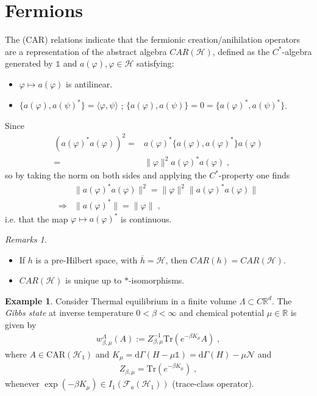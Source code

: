 \documentclass[
a4paper, %
11pt, %
onecolumn, %
openany, %
]{memoir}
\theoremstyle{definition}
\newtheorem{example}{Example}[chapter]
\theoremstyle{remark}
\newtheorem{remarks}{Remarks}[chapter]
\theoremstyle{plain}
\begin{document}
\section{Fermions}
The (CAR) relations indicate that the fermionic creation/anihilation operators are a representation of the abstract algebra $CAR(\mathcal{H})$, defined as the $C^*$-algebra generated by $\mathds{1}$ and $a(\varphi), \varphi\in\mathcal{H}$ satisfying: \begin{itemize}
	\item $\varphi\mapsto a(\varphi)$ is antilinear.
	\item $\{a(\varphi),a(\psi)^*\}=\langle\varphi,\psi\rangle$ ; $\{a(\varphi),a(\psi)\}=0=\{a(\varphi)^*,a(\psi)^*\}$. 
\end{itemize}
Since \begin{align}
(a(\varphi)^*a(\varphi))^2=&a(\varphi)^*\{a(\varphi),a(\varphi)^*\}a(\varphi)\\
=&\|\varphi\|^2a(\varphi)^*a(\varphi)\;,\end{align}
so by taking the norm on both sides and applying the $C^*$-property one finds \begin{align}
&\|a(\varphi)^*a(\varphi)\|^2=\|\varphi\|^2\|a(\varphi)^*a(\varphi)\|\\
\Rightarrow&\|a(\varphi)^*\|=\|\varphi\|\; ,
\end{align}
i.e. that the map $\varphi\mapsto a(\varphi)^*$ is continuous. \begin{remarks}
	\begin{itemize}
		\item If $h$ is a pre-Hilbert space, with $\overline{h}=\mathcal{H}$, then $CAR(h)=CAR(\mathcal{H})$.
		\item $CAR(\mathcal{H})$ is unique up to $*$-isomorphisms.
	\end{itemize}
\end{remarks}
\begin{example} Consider Thermal equilibrium in a finite volume $\Lambda \subset C\mathbb{R}^d$. The \textit{Gibbs state} at inverse temperature $0<\beta<\infty$ and chemical potential $\mu\in\mathbb{R}$ is given by \begin{align}
w_{\beta,\mu}^{\Lambda}(A):=Z^{-1}_{\beta,\mu} \mathrm{Tr}(e^{-\beta K_{\mu}}A)\; ,\label{Eqn::def_gibbs_state}
\end{align}
where $A\in \mathrm{CAR}(\mathcal{H}_1)$ and $K_{\mu}=\mathrm{d}\Gamma(H-\mu\mathds{1})=\mathrm{d}\Gamma(H)-\mu\mathcal{N}$ and \begin{align}
Z_{\beta,\mu}=\mathrm{Tr}(e^{-\beta K_{\mu}})\; ,
\end{align}
whenever $\exp(-\beta K_{\mu})\in I_1(\mathcal{F}_a(\mathcal{H}_1))$ (trace-class operator).\end{example}
\end{document}
